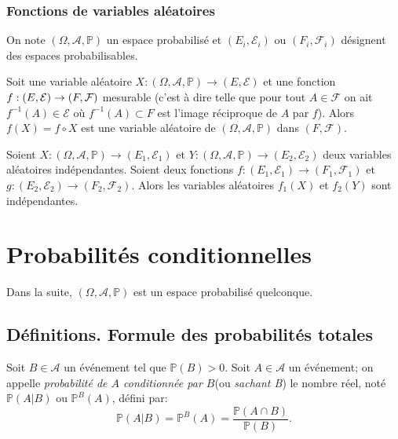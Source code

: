 \subsubsection{Fonctions de variables aléatoires}

On note  $(\Omega,\mathcal{A},\mathbb{P})$ un espace probabilisé et $(E_i,\mathcal E_i)$ ou $(F_i,\mathcal F_i) $ désignent des espaces probabilisables.

Soit une variable aléatoire $X:(\Omega,\mathcal{A},\mathbb{P}) \to(E, \mathcal{E})$ et une fonction $f : (E,\mathcal E) \to (F, \mathcal {\mathcal{F}})$ mesurable (c'est à dire telle que pour tout $A\in \mathcal F$  on ait $f^{-1}(A) \in \mathcal E$ où $f^{-1} (A)\subset F$ est l'image réciproque de $A$ par $f$). Alors $f(X) = f \circ X$ est une variable aléatoire de $(\Omega,\mathcal{A},\mathbb{P})$ dans $(F, \mathcal{F})$.
\pl{\rep{2cm}}


\begin{proposition}
Soient $X:(\Omega,\mathcal{A},\mathbb{P}) \to (E_1, \mathcal{E}_1)$ et  $Y:(\Omega,\mathcal{A},\mathbb{P}) \to (E_2, \mathcal{E}_2)$ deux variables aléatoires indépendantes. Soient deux fonctions $f : (E_1, \mathcal{E}_1) \to (F_1, \mathcal{F}_1)$ et $g : (E_2, \mathcal{E}_2) \to (F_2, \mathcal{F}_2)$. Alors les variables aléatoires $f_1(X)$ et $f_2(Y)$ sont indépendantes.
\end{proposition}

\begin{exemple}
	\pl{\rep{2cm}}
\end{exemple}

\section[Conditionnement]{Probabilités conditionnelles}

Dans la suite, $(\Omega,\mathcal{A},\mathbb{P})$ est un espace probabilisé quelconque.


\subsection{Définitions. Formule des probabilités totales}

\begin{definition}
	Soit $B \in \mathcal{A}$ un événement tel que $\mathbb{P} (B) >0$. Soit $A \in \mathcal{A}$ un événement; on appelle \emph{probabilité de $A$ conditionnée par $B$}(ou \emph{sachant B})  le nombre réel, noté $\mathbb{P} (A | B)$ ou $\mathbb{P}^B(A)$, défini par:
$$ \mathbb{P} (A | B) = \mathbb{P}^B(A) = \frac{\mathbb{P} (A \cap B)}{\mathbb{P} (B)}. $$
\end{definition}


